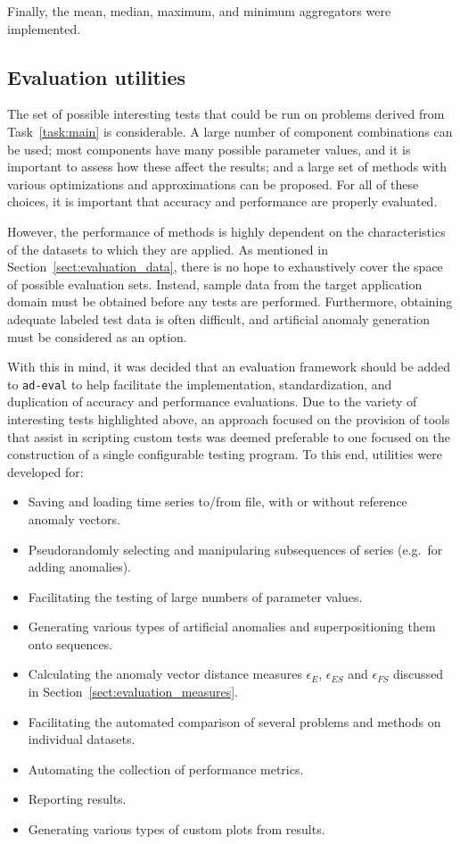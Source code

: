 Finally, the mean, median, maximum, and minimum aggregators were implemented.

\subsection{Evaluation utilities}
\label{sect:evaluation_package}

The set of possible interesting tests that could be run on problems derived from Task~\ref{task:main} is considerable. A large number of component combinations can be used; most components have many possible parameter values, and it is important to assess how these affect the results; and a large set of methods with various optimizations and approximations can be proposed. For all of these choices, it is important that accuracy and performance are properly evaluated.

However, the performance of methods is highly dependent on the characteristics of the datasets to which they are applied. As mentioned in Section~\ref{sect:evaluation_data}, there is no hope to exhaustively cover the space of possible evaluation sets. Instead, sample data from the target application domain must be obtained before any tests are performed. Furthermore, obtaining adequate labeled test data is often difficult, and artificial anomaly generation must be considered as an option.

With this in mind, it was decided that an evaluation framework should be added to \texttt{ad-eval} to help facilitate the implementation, standardization, and duplication of accuracy and performance evaluations. Due to the variety of interesting tests highlighted above, an approach focused on the provision of tools that assist in scripting custom tests was deemed preferable to one focused on the construction of a single configurable testing program. To this end, utilities were developed for:

\begin{itemize}
    \item Saving and loading time series to/from file, with or without reference anomaly vectors.
    \item Pseudorandomly selecting and manipularing subsequences of series (e.g.\ for adding anomalies).
    \item Facilitating the testing of large numbers of parameter values.
    \item Generating various types of artificial anomalies and superpositioning them onto sequences.
    \item Calculating the anomaly vector distance measures $\epsilon_E$, $\epsilon_{ES}$ and $\epsilon_{FS}$ discussed in Section~\ref{sect:evaluation_measures}.
    \item Facilitating the automated comparison of several problems and methods on individual datasets.
    \item Automating the collection of performance metrics.
    \item Reporting results.
    \item Generating various types of custom plots from results.
\end{itemize}

